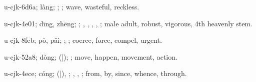 \begin{multicols}{2}
{\cjkgGlue{}u-cjk-6d6a; làng; \cjkgGlue{}; \cjkgGlue{}; wave, wasteful, reckless.

\cjkgGlue{}u-cjk-4e01; dīng, zhēng; \cjkgGlue{}; \cjkgGlue{}, \cjkgGlue{}, \cjkgGlue{}, \cjkgGlue{}, \cjkgGlue{}; male adult, robust, vigorous, 4th heavenly stem.

\cjkgGlue{}u-cjk-8feb; pò, pǎi; \cjkgGlue{}\cjkgGlue{}\cjkgGlue{}; \cjkgGlue{}; coerce, force, compel, urgent.

\cjkgGlue{}u-cjk-52a8; dòng; \cjkgGlue{}\cjkgGlue{}(\cjkgGlue{}|\cjkgGlue{}); \cjkgGlue{}; move, happen, movement, action.

\cjkgGlue{}u-cjk-4ece; cóng; \cjkgGlue{}\cjkgGlue{}(\cjkgGlue{}|\cjkgGlue{}), \cjkgGlue{}; \cjkgGlue{}, \cjkgGlue{}, \cjkgGlue{}; from, by, since, whence, through.

}
\end{multicols}
